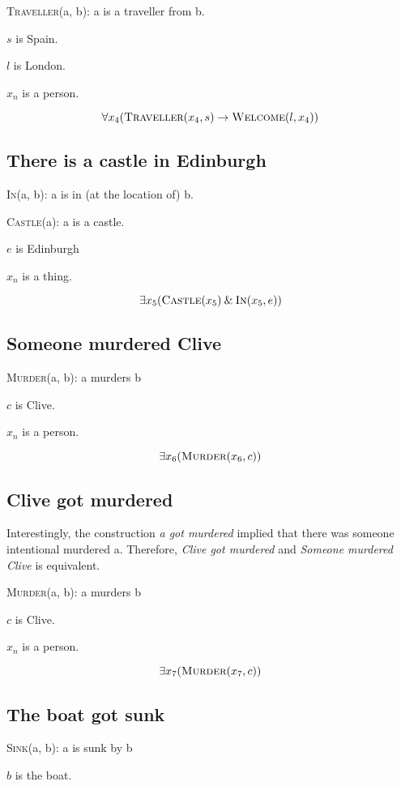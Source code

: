 \documentclass{article}
\begin{document}
\textsc{Traveller}(a, b): a is a traveller from b.

$s$ is Spain.

$l$ is London.

$x_n$ is a person. 


$$\forall x_4 (\textsc{Traveller}(x_4,s) \rightarrow \textsc{Welcome}(l, x_4)) $$


\subsection{There is a castle in Edinburgh}

\textsc{In}(a, b): a is in (at the location of) b.

\textsc{Castle}(a): a is a castle.

$e$ is Edinburgh

$x_n$ is a thing. 

$$\exists x_5 (\textsc{Castle}(x_5) \mathbin{\&} \textsc{In}(x_5, e))$$


\subsection{Someone murdered Clive}
\textsc{Murder}(a, b): a murders b

$c$ is Clive.

$x_n$ is a person. 

$$\exists x_6 (\textsc{Murder}(x_6, c))$$

\subsection{Clive got murdered}

Interestingly, the construction \textit{a got murdered} implied that there was someone intentional murdered a. Therefore, \textit{Clive got murdered} and \textit{Someone murdered Clive} is equivalent.

\textsc{Murder}(a, b): a murders b

$c$ is Clive.

$x_n$ is a person. 

$$\exists x_7 (\textsc{Murder}(x_7, c))$$

\subsection{The boat got sunk}

\textsc{Sink}(a, b): a is sunk by b

$b$ is the boat.
\end{document}
